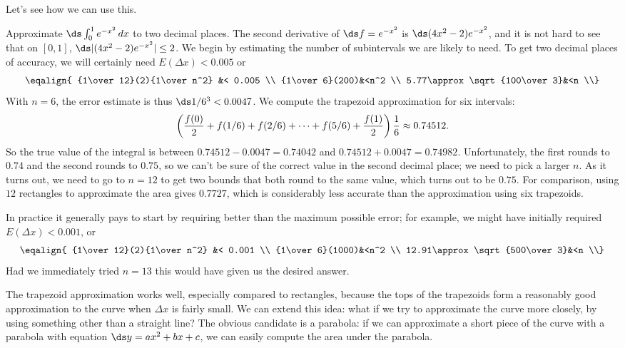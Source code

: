Let's see how we can use this. 

\begin{example} Approximate $\ds\int_0^1 e^{-x^2}\,dx$ to two decimal places.
The second derivative of $\ds f=e^{-x^2}$ is $\ds(4x^2-2)e^{-x^2}$, and
it is not hard to see that on $[0,1]$, $\ds|(4x^2-2)e^{-x^2}|\le 2$.
We begin by estimating the number of subintervals we are likely to
need. To get two decimal places of accuracy, we will certainly need
$E(\Delta x)<0.005$ or
$$
  \eqalign{
  {1\over12}(2){1\over n^2} &< 0.005 \\
  {1\over6}(200)&<n^2 \\
  5.77\approx\sqrt{100\over3}&<n \\}
$$
With $n=6$, the error estimate is thus $\ds1/6^3<0.0047$.
We compute the trapezoid approximation for six intervals:
$$
  \left({f(0)\over2}+f(1/6)+f(2/6)+\cdots+f(5/6)+{f(1)\over2}\right){1\over6}
  \approx 0.74512.
$$
So the true value of the integral is between $0.74512-0.0047=0.74042$ and
$0.74512+0.0047=0.74982$. Unfortunately, the first rounds to $0.74$
and the second 
rounds to $0.75$, so we can't be sure of the correct value in
the second decimal place; we need to pick a larger $n$.
As it turns out, we need to go to $n=12$ to get two bounds that both
round to the same value, which turns out to be $0.75$. For comparison,
using $12$ rectangles to approximate the area gives $0.7727$, which is
considerably less accurate than the approximation using six trapezoids.

In practice it
generally pays to start by requiring better than the maximum possible
error; for example, we might have initially required $E(\Delta
x)<0.001$, or 
$$
  \eqalign{
  {1\over12}(2){1\over n^2} &< 0.001 \\
  {1\over6}(1000)&<n^2 \\
  12.91\approx\sqrt{500\over3}&<n \\}
$$
Had we immediately tried $n=13$ this would have given us the desired
answer. 
\end{example}

The trapezoid approximation works well, especially compared to
rectangles, because the tops of the trapezoids form a reasonably good
approximation to the curve when $\Delta x$ is fairly small. We can
extend this idea: what if we try to approximate the curve more
closely, by using something other than a straight line? The obvious
candidate is a parabola: if we can approximate a short piece of the
curve with a parabola with equation $\ds y=ax^2+bx+c$, we can easily
compute the area under the parabola.

